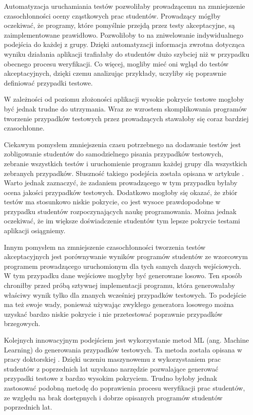 Automatyzacja uruchamiania testów pozwoliłaby prowadzącemu na zmniejszenie czasochłonności oceny cząstkowych prac studentów.
Prowadzący mógłby oczekiwać, że programy, które pomyślnie przejdą przez testy akceptacyjne, są zaimplementowane prawidłowo.
Pozwoliłoby to na zniwelowanie indywidualnego podejścia do każdej z grupy.
Dzięki automatyzacji informacja zwrotna dotycząca wyniku działania aplikacji trafiałaby do studentów dużo szybciej niż w przypadku obecnego procesu weryfikacji.
Co więcej, mogliby mieć oni wgląd do testów akceptacyjnych, dzięki czemu analizując przykłady, uczyliby się poprawnie definiować przypadki testowe.

W zależności od poziomu złożoności aplikacji wysokie pokrycie testowe mogłoby być jednak trudne do utrzymania.
Wraz ze wzrostem skomplikowania programów tworzenie przypadków testowych przez prowadzących stawałoby się coraz bardziej czasochłonne.

Ciekawym pomysłem zmniejszenia czasu potrzebnego na dodawanie testów jest zobligowanie studentów do samodzielnego pisania przypadków testowych, zebranie wszystkich testów i uruchomienie programu każdej grupy dla wszystkich zebranych przypadków. 
Słuszność takiego podejścia została opisana w artykule \cite{write-tests-by-students}.
Warto jednak zaznaczyć, że zadaniem prowadzącego w tym przypadku byłaby ocena jakości przypadków testowych.
Dodatkowo mogłoby się okazać, że zbiór testów ma stosunkowo niskie pokrycie, co jest wysoce prawdopodobne w przypadku studentów rozpoczynających naukę programowania.
Można jednak oczekiwać, że im większe doświadczenie studentów tym lepsze pokrycie testami aplikacji osiągniemy.

Innym pomysłem na zmniejszenie czasochłonności tworzenia testów akceptacyjnych jest porównywanie wyników programów studentów ze wzorcowym programem prowadzącego uruchomionym dla tych samych danych wejściowych.
W tym przypadku dane wejściowe mogłyby być generowane losowo.
Ten sposób chroniłby przed próbą sztywnej implementacji programu, która generowałaby właściwy wynik tylko dla znanych wcześniej przypadków testowych.
To podejście ma też swoje wady, ponieważ używając zwykłego generatora losowego można uzyskać bardzo niskie pokrycie i nie przetestować poprawnie przypadków brzegowych.

Kolejnych innowacyjnym podejściem jest wykorzystanie metod ML (ang. Machine Learning) do generowania przypadków testowych. 
Ta metoda została opisana w pracy doktorskiej \cite{teach-testing-thesis}. 
Dzięki uczeniu maszynowemu z wykorzystaniem prac studentów z poprzednich lat uzyskano narzędzie pozwalające generować przypadki testowe z bardzo wysokim pokryciem.
Trudno byłoby jednak zastosować podobną metodę do poprawienia procesu weryfikacji prac studentów, ze względu na brak dostępnych i dobrze opisanych programów studentów poprzednich lat.




